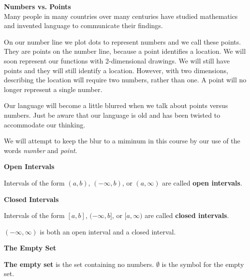 \documentclass{ximera}
\begin{document}
\begin{warning}  \textbf{\textcolor{red!80!black}{Numbers vs. Points}} \\

Many people in many countries over many centuries have studied mathematics and invented language to communicate their findings.

On our number line we plot dots to represent numbers and we call these points.  They are points on the number line, because a point identifies a location.  We will soon represent our functions with 2-dimensional drawings. We will still have points and they will still identify a location.  However, with two dimensions, describing the location will require two numbers, rather than one.  A point will no longer represent a single number.

Our language will become a little blurred when we talk about points versus numbers.  Just be aware that our language is old and has been twisted to accommodate our thinking.


We will attempt to keep the blur to a miminum in this course by our use of the words \textit{number} and \textit{point}.
\end{warning}




\begin{definition} \textbf{\textcolor{green!50!black}{Open Intervals}}

Intervals of the form $(a, b)$, $(-\infty, b)$, or $(a, \infty)$ are called \textbf{open intervals}.

\end{definition}



\begin{definition} \textbf{\textcolor{green!50!black}{Closed Intervals}}

Intervals of the form $[a, b]$, $(-\infty, b]$, or $[a, \infty)$ are called \textbf{closed intervals}.

\end{definition}




\begin{warning}

$(-\infty, \infty)$ is both an open interval and a closed interval.


\end{warning}




\begin{definition} \textbf{\textcolor{green!50!black}{The Empty Set}}

\textbf{The empty set} is the set containing no numbers.  $\emptyset$ is the symbol for the empty set.

\end{definition}
\end{document}
